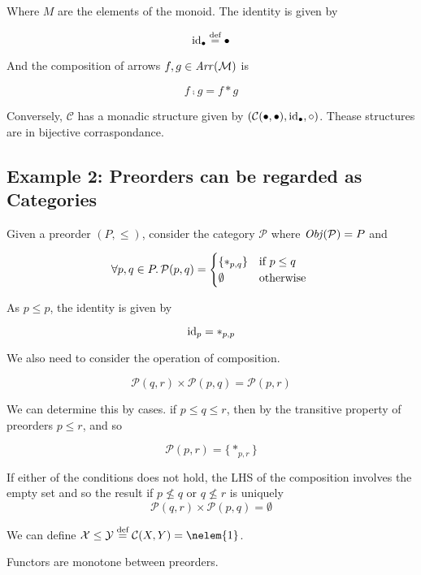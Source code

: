Where $M$ are the elements of the monoid. The identity is given by

\begin{equation*}
\mathrm{id}_{ \bullet } \stackrel{\text{def}}{=} \bullet
\end{equation*}

And the composition of arrows $f, g \in \operatorname{\mathit{Arr}}(\mathcal M)$ is

\begin{equation*}
f \comp g = f \ast g
\end{equation*}

Conversely, $\mathcal C$ has a monadic structure given by
$(\mathcal{C}(\bullet, \bullet), \mathrm{id}_{ \bullet }, \circ)$. Thease structures
are in bijective corraspondance.

\subsection{Example 2: Preorders can be regarded as Categories}
\begin{example}

Given a preorder $(P, \leq)$, consider the category $\mathcal P$
where $\operatorname{\mathit{Obj}}(\mathcal P) = P$ and

\begin{equation*}
\forall p,q \in P  \ldotp \mathcal{P}(p, q) = \begin{cases}
    \{\ast_{p,q}\} & \text{if } p \leq q\\
    \emptyset & \text{otherwise }
\end{cases}
\end{equation*}

As $p \leq p$, the identity is given by

\begin{equation*}
\mathrm{id}_{ p } = \ast_{p,p}
\end{equation*}

We also need to consider the operation of composition.

\begin{equation*}
\mathcal{P}(q, r) \times \mathcal{P}(p, q) = \mathcal{P}(p, r)
\end{equation*}

We can determine this by cases. if $p \leq q \leq r$, then by the transitive
property of preorders $p \leq r$, and so

\begin{equation*}
\mathcal{P}(p, r) = \{\ast_{p,r}\}
\end{equation*}

If either of the conditions does not hold, the LHS of the composition involves
the empty set and so the result if $p \nleq q$ or $q \nleq r$ is uniquely
\begin{equation*}
\mathcal{P}(q, r) \times \mathcal{P}(p, q) = \emptyset
\end{equation*}

We can define $\mathcal{X}\leq \mathcal{Y} \eqdef \mathcal{C}(X, Y) = \nelem{1}$.

Functors are monotone between preorders.
\end{example}

